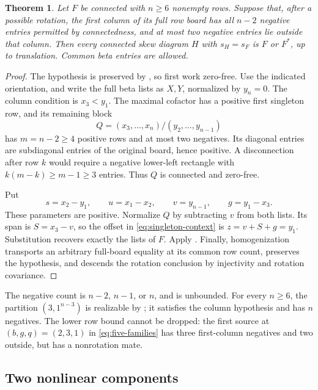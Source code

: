 \documentclass[11pt,a4paper]{amsart}
\numberwithin{equation}{section}
\theoremstyle{plain}
\newtheorem{theorem}{Theorem}[section]
\theoremstyle{definition}
\begin{document}
\begin{theorem}\label{thm:saturated-column}
Let \(F\) be connected with \(n\ge6\) nonempty rows.  Suppose that,
after a possible rotation, the first column of its full row board has
all \(n-2\) negative entries permitted by connectedness, and at most two
negative entries lie outside that column.  Then every connected skew
diagram \(H\) with \(s_H=s_F\) is \(F\) or \(F^*\), up to
translation.  Common beta entries are allowed.
\end{theorem}

\begin{proof}
The hypothesis is preserved by , so first work
zero-free.  Use the indicated orientation, and write the full beta lists
as \(X,Y\), normalized by \(y_n=0\).  The column condition is
\(x_3<y_1\).  The maximal cofactor has a positive first singleton row,
and its remaining block
\[
 Q=(x_3,\ldots,x_n)/(y_2,\ldots,y_{n-1})
\]
has \(m=n-2\ge4\) positive rows and at most two negatives.  Its diagonal
entries are subdiagonal entries of the original board, hence positive.
A disconnection after row \(k\) would require a negative lower-left
rectangle with \(k(m-k)\ge m-1\ge3\) entries.  Thus \(Q\) is connected
and zero-free.

Put
\[
 s=x_2-y_1,\qquad u=x_1-x_2,\qquad
 v=y_{n-1},\qquad g=y_1-x_3.
\]
These parameters are positive.  Normalize \(Q\) by subtracting \(v\)
from both lists.  Its span is \(S=x_3-v\), so the offset in
\eqref{eq:singleton-context} is \(z=v+S+g=y_1\).  Substitution recovers
exactly the lists of \(F\).  Apply .
Finally, homogenization transports an arbitrary full-board equality at
its common row count, preserves the hypothesis, and descends the rotation
conclusion by injectivity and rotation covariance.
\end{proof}

The negative count is \(n-2\), \(n-1\), or \(n\), and is unbounded.
For every \(n\ge6\), the partition \((3,1^{n-3})\) is realizable by
; it satisfies the column hypothesis and
has \(n\) negatives.  The lower row bound cannot be dropped: the first
source at \((b,g,q)=(2,3,1)\) in \eqref{eq:five-families} has three
first-column negatives and two outside, but has a nonrotation mate.

\subsection{Two nonlinear components}
\end{document}
